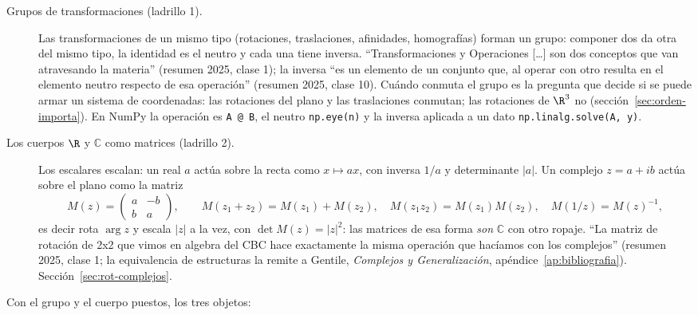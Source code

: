 \begin{description}
  \item[Grupos de transformaciones (ladrillo 1).] Las transformaciones de un mismo tipo
  (rotaciones, traslaciones, afinidades, homografías) forman un grupo: componer dos da otra
  del mismo tipo, la identidad es el neutro y cada una tiene inversa. ``Transformaciones y
  Operaciones [\ldots] son dos conceptos que van atravesando la materia'' (resumen 2025,
  clase 1); la inversa ``es un elemento de un conjunto que, al operar con otro resulta en el
  elemento neutro respecto de esa operación'' (resumen 2025, clase 10). Cuándo conmuta el
  grupo es la pregunta que decide si se puede armar un sistema de coordenadas: las
  rotaciones del plano y las traslaciones conmutan; las rotaciones de \(\R^3\) no
  (sección~\ref{sec:orden-importa}). En NumPy la operación es \texttt{A @ B}, el neutro
  \texttt{np.eye(n)} y la inversa aplicada a un dato \texttt{np.linalg.solve(A, y)}.
  \item[Los cuerpos \(\R\) y \(\mathbb{C}\) como matrices (ladrillo 2).] Los escalares
  escalan: un real \(a\) actúa sobre la recta como \(x\mapsto ax\), con inversa \(1/a\) y
  determinante \(|a|\). Un complejo \(z=a+ib\) actúa sobre el plano como la matriz
  \[
    M(z)=\begin{pmatrix}a&-b\\ b&a\end{pmatrix},\qquad
    M(z_1+z_2)=M(z_1)+M(z_2),\quad M(z_1z_2)=M(z_1)M(z_2),\quad M(1/z)=M(z)^{-1},
  \]
  es decir rota \(\arg z\) y escala \(|z|\) a la vez, con \(\det M(z)=|z|^2\): las matrices
  de esa forma \emph{son} \(\mathbb{C}\) con otro ropaje. ``La matriz de rotación de 2x2 que
  vimos en algebra del CBC hace exactamente la misma operación que hacíamos con los
  complejos'' (resumen 2025, clase 1; la equivalencia de estructuras la remite a Gentile,
  \emph{Complejos y Generalización}, apéndice~\ref{ap:bibliografia}). Sección~\ref{sec:rot-complejos}.
\end{description}

Con el grupo y el cuerpo puestos, los tres objetos:

